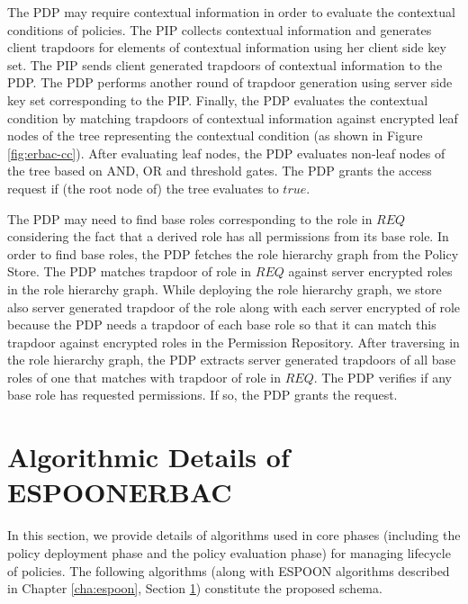 \documentclass[epsfig,a4paper,11pt,titlepage]{book}
\numberwithin{algorithm}{chapter}
\begin{document}
The \gls{PDP} may require contextual information in order to evaluate the contextual conditions of policies. The \gls{PIP} collects contextual information and generates client trapdoors for elements of contextual information using her client side key set. The \gls{PIP} sends client generated trapdoors of contextual information to the \gls{PDP}. The \gls{PDP} performs another round of trapdoor generation using server side key set corresponding to the \gls{PIP}. Finally, the \gls{PDP} evaluates the contextual condition by matching trapdoors of contextual information against encrypted leaf nodes of the tree representing the contextual condition (as shown in Figure \ref{fig:erbac-cc}). After evaluating leaf nodes, the \gls{PDP} evaluates non-leaf nodes of the tree based on AND, OR and threshold gates. The \gls{PDP} grants the access request if (the root node of) the tree evaluates to $\mathit{true}$.

The \gls{PDP} may need to find base roles corresponding to the role in $\mathit{REQ}$ considering the fact that a derived role has all permissions from its base role. In order to find base roles, the \gls{PDP} fetches the role hierarchy graph from the Policy Store. The \gls{PDP} matches trapdoor of role in $\mathit{REQ}$ against server encrypted roles in the role hierarchy graph. While deploying the role hierarchy graph, we store also server generated trapdoor of the role along with each server encrypted of role because the \gls{PDP} needs a trapdoor of each base role so that it can match this trapdoor against encrypted roles in the Permission Repository. After traversing in the role hierarchy graph, the \gls{PDP} extracts server generated trapdoors of all base roles of one that matches with trapdoor of role in $\mathit{REQ}$. The \gls{PDP} verifies if any base role has requested permissions. If so, the \gls{PDP} grants the request.



\section[Algorithmic Details of ESPOON$_{\mathit{ERBAC}}$]{Algorithmic Details of \gls{ESPOONERBAC}}
\label{sec:erbac-algorithmic-details}
In this section, we provide details of algorithms used in core phases (including the policy deployment phase and the policy evaluation phase) for managing lifecycle of policies. The following algorithms (along with \gls{ESPOON} algorithms described in Chapter \ref{cha:espoon}, Section \ref{sec:erbac-algorithmic-details}) constitute the proposed schema. 
\end{document}
